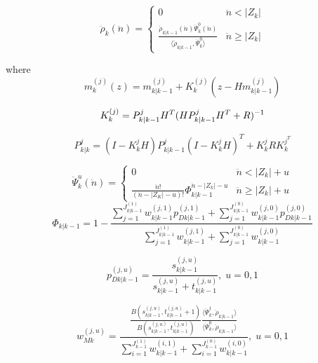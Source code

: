 \documentclass{article}
\newcommand{\clut}{{(0)}}
\newcommand{\tgt}{{(1)}}
\newcommand{\clutj}{{(j,0)}}
\newcommand{\tgtj}{{(j,1)}}
\newcommand{\cluti}{{(i,0)}}
\newcommand{\tgti}{{(i,1)}}
\begin{document}
\begin{equation}
  \label{eq:lpd_rhok}
  \ddot{\rho}_k(\ddot{n}) =
  \begin{cases}
    0 & \ddot{n} < |Z_k| \\
    \frac{ \ddot{\rho}_{k|k-1}(\ddot{n})\ddot{\Psi}_k^0(\ddot{n})}{\langle \ddot{\rho}_{k|k-1}, \ddot{\Psi}_k^0 \rangle  } & \ddot{n} \ge |Z_k|
  \end{cases}
\end{equation}

where
\begin{equation}
  \label{eq:lpd_mk}
  m_k^{(j)}(z) = m_{k|k-1}^{(j)} + K_k^{(j)}(z - Hm_{k|k-1}^{(j)})
\end{equation}

\begin{equation}
  \label{eq:lpd_kalman_gain}
  K_k^{(j)} = P_{k|k-1}^jH^T(HP_{k|k-1}^jH^T + R)^{-1}\\
\end{equation}

\begin{equation}
  \label{eq:lpd_Pk}
  P_{k|k}^j = (I - K_k^jH)P_{k|k-1}^j(I - K_k^jH)^T + K_k^jRK_k^{j^T}
\end{equation}

\begin{equation}
  \label{eq:lpd_psi}
  \ddot{\Psi}_k^u(\ddot{n}) =
  \begin{cases}
    0 & \ddot{n} < |Z_k| + u \\
   \frac{\ddot{n}!}{(\ddot{n}-|Z_K|-u)!}\Phi_{k|k-1}^{\ddot{n} - |Z_k|-u} & \ddot{n} \ge |Z_k|+u
  \end{cases}
\end{equation}
\begin{equation}
  \label{eq:lpd_Phi}
  \Phi_{k|k-1} = 1 - \frac{\sum_{j=1}^{J_{k|k-1}^\tgt}w_{k|k-1}^\tgtj p_{Dk|k-1}^\tgtj + \sum_{j=1}^{J_{k|k-1}^\clut}w_{k|k-1}^\clutj p_{Dk|k-1}^\clutj}
  {\sum_{j=1}^{J_{k|k-1}^\tgt}w_{k|k-1}^\tgtj + \sum_{j=1}^{J_{k|k-1}^\clut}w_{k|k-1}^\clutj}
\end{equation}

\begin{equation}
  \label{eq:pdkk1}
  p_{Dk|k-1}^{(j,u)} = \frac{ s_{k|k-1}^{(j, u)}}{s_{k|k-1}^{(j, u)} + t_{k|k-1}^{(j, u)}},\;u=0,1
\end{equation}

\begin{equation}
  \label{eq:lpd_wmk}
  w_{Mk}^{(j,u)} = \frac{
    \frac{B\left( s_{k|k-1}^{(j,u)},t_{k|k-1}^{(j,u)}+1\right)}{B\left( s_{k|k-1}^{(j,u)},t_{k|k-1}^{(j,u)}\right)}
    \frac{\langle\ddot{\Psi}_k^1,\ddot{\rho}_{k|k-1}\rangle}{\langle\ddot{\Psi}_k^0,\ddot{\rho}_{k|k-1}\rangle}  }
  {\sum_{i=1}^{J_{k-1}^\tgt}w_{k|k-1}^\tgti + \sum_{i=1}^{J_{k-1}^\clut}w_{k|k-1}^\cluti},\; u=0,1
\end{equation}
\end{document}
